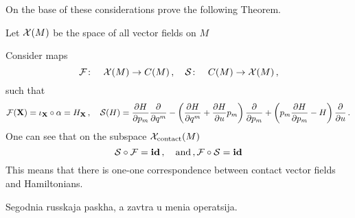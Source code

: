 On the base of these considerations prove the following 
Theorem.

\def\XX {{\cal X}}
\def\FF {{\cal F}}
\def\SS {{\cal S}}


  Let $\XX(M)$  be the space of all vector fields on $M$ 


Consider maps 
      $$
\FF\colon\quad \XX(M)\to C(M)\,,\quad
\SS\colon\quad C(M)\to \XX(M)\,,
      $$
such that
    $$
\FF(\X)=\iota_\X\circ \a=H_\X\,,\quad
\SS(H)={\p H\over \p p_m}{\p \over \p q^m}
   -
\left(
 {\p H\over \p q^m}+
   {\p H\over \p u}p_m
 \right)
{\p \over \p p_m}
        +\left(p_m{\p H\over \p p_m}-H
 \right){\p\over \p u}\,.
    $$
One can see that on the subspace $\XX_{\rm contact}(M)$
       $$
\SS\circ\FF={\bf id}\,,\quad {\rm and}\,,
\FF\circ\SS={\bf id} 
        $$
This means that there is one-one correspondence
between contact vector fields and Hamiltonians.

Segodnia russkaja paskha, a zavtra u menia operatsija.

\bye

